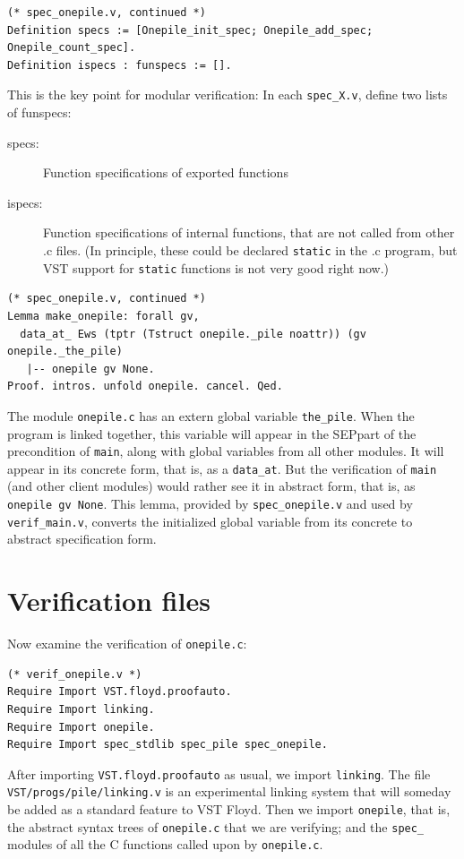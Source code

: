 \documentclass[runningheads,orivec]{llncs}
\newcommand{\SEP}{\mbox{\small SEP}}
\begin{document}
\begin{lstlisting}
(* spec_onepile.v, continued *)
Definition specs := [Onepile_init_spec; Onepile_add_spec; Onepile_count_spec].
Definition ispecs : funspecs := [].
\end{lstlisting}
This is the key point for modular verification:  In each
\lstinline{spec_X.v}, define two lists of funspecs:
\begin{description}
\item[specs:] Function specifications of exported functions
\item[ispecs:] Function specifications of internal functions, that
  are not called from other .c files.  (In principle, these could
  be declared \lstinline{static} in the .c program, but VST
  support for \lstinline{static} functions is not very good right now.)
\end{description}

\begin{lstlisting}
(* spec_onepile.v, continued *)
Lemma make_onepile: forall gv, 
  data_at_ Ews (tptr (Tstruct onepile._pile noattr)) (gv onepile._the_pile)
   |-- onepile gv None.
Proof. intros. unfold onepile. cancel. Qed.
\end{lstlisting}
The module \lstinline{onepile.c} has an extern global variable
\lstinline{the_pile}.  When the program is linked together,
this variable will appear in the \SEP part of the precondition
of \lstinline{main}, along with global variables from all other
modules.  It will appear in its concrete form, that is,
as a \lstinline{data_at}.  But the verification of
\lstinline{main} (and other client modules) would rather see it
in abstract form, that is, as \lstinline{onepile gv None}.
This lemma, provided by \lstinline{spec_onepile.v} and used
by \lstinline{verif_main.v}, converts the initialized global variable
from its concrete to abstract specification form.

\section{Verification files}
Now examine the verification of \lstinline{onepile.c}:

\begin{lstlisting}
(* verif_onepile.v *)
Require Import VST.floyd.proofauto.
Require Import linking.
Require Import onepile.
Require Import spec_stdlib spec_pile spec_onepile.
\end{lstlisting}
After importing \lstinline{VST.floyd.proofauto} as usual,
we import
\lstinline{linking}.  The file \linebreak \lstinline{VST/progs/pile/linking.v}
is an experimental linking system that will someday
be added as a standard feature to VST Floyd.
Then we import \lstinline{onepile}, that is,
the abstract syntax trees of \lstinline{onepile.c} that
we are verifying; and the \lstinline{spec_} modules of all
the C functions called upon by \lstinline{onepile.c}.
\end{document}
